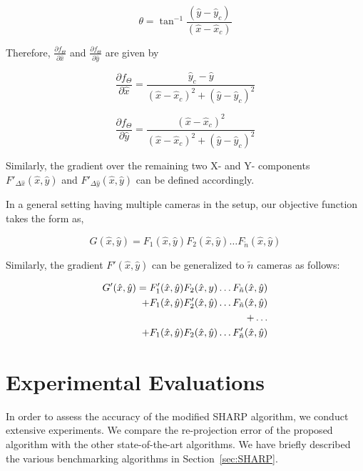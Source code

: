 \begin{equation*}
\theta = \tan ^{-1}\frac{(\hat{y}-\hat{y}_c)}{(\hat{x}-\hat{x}_c)}
\end{equation*} 

Therefore, $\frac{\partial f_{\Theta}}{\partial \hat{x}}$ and $\frac{\partial f_{\Theta}}{\partial \hat{y}}$ are given by 

\begin{equation*}
\frac{\partial f_{\Theta}}{\partial \hat{x}} = \frac{\hat{y}_c - \hat{y}}{(\hat{x} - \hat{x}_c)^2 + (\hat{y} - \hat{y}_c)^2}
\end{equation*}

\begin{equation*}
\frac{\partial f_{\Theta}}{\partial \hat{y}} = \frac{(\hat{x} - \hat{x}_c)^2}{(\hat{x} - \hat{x}_c)^2 + (\hat{y} - \hat{y}_c)^2}
\end{equation*}

Similarly, the gradient over the remaining two X- and Y- components $F'_{\Delta \hat{x}}(\hat{x},\hat{y})$ and $F'_{\Delta \hat{y}}(\hat{x},\hat{y})$ can be defined accordingly.

In a general setting having multiple cameras in the setup, our objective function takes the form as,

\begin{equation*}
G(\hat{x},\hat{y}) = F_1(\hat{x},\hat{y})F_2(\hat{x},\hat{y}) \ldots F_{\tilde{n}}(\hat{x},\hat{y})
\end{equation*} 

Similarly, the gradient $F'(\hat{x},\hat{y})$ can be generalized to $\tilde{n}$ cameras as follows:

\begin{equation*}
\centering
\begin{aligned}
G'(\hat{x},\hat{y}) = F_1'(\hat{x},\hat{y})F_2(\hat{x},y) \ldots F_{\tilde{n}}(\hat{x},\hat{y}) \\
+ F_1(\hat{x},\hat{y})F_2'(\hat{x},\hat{y}) \ldots F_{\tilde{n}}(\hat{x},\hat{y}) \\
+ \ldots \\
+ F_1(\hat{x},\hat{y})F_2(\hat{x},\hat{y}) \ldots F_{\tilde{n}}'(\hat{x},\hat{y})
\end{aligned}
\end{equation*}


\section{Experimental Evaluations}
\label{sec:chap8-exps}
In order to assess the accuracy of the modified SHARP algorithm, we conduct extensive experiments. We compare the re-projection error of the proposed algorithm with the other state-of-the-art algorithms. We have briefly described the various benchmarking algorithms in Section~\ref{sec:SHARP}. 

